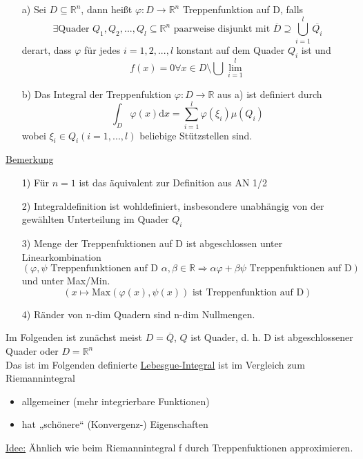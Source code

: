\begin{definition}[Treppenfunktion]\leavevmode
	\begin{itemize}
		\item[a)] Sei $D \subseteq \mathbb{R}^n$, dann heißt $\varphi :D \to \mathbb{R}^n$ Treppenfunktion auf D, falls
		      \[ \exists \text{Quader } Q_1, Q_2, ..., Q_l \subseteq \mathbb{R}^n \text{ paarweise disjunkt mit } \overline{D} \supseteq \bigcup_{i=1}^l \overline{Q_i}\]
		      derart, dass $\varphi$ für jedes $i = 1,2,...,l$ konstant auf dem Quader $Q_i$ ist und \[f(x) = 0 \forall x \in D\setminus \bigcup\lim_{i=1}^l\]
		\item[b)] Das Integral der Treppenfuktion $\varphi\colon D \to \mathbb{R}$ aus a) ist definiert durch
		      \[ \int_D \varphi(x) \text{d}x = \sum_{i=1}^l \varphi(\xi_i) \mu(Q_i)\]
		      wobei $\xi_i \in Q_i (i=1,...,l)$ beliebige Stützstellen sind. 
	\end{itemize}
\end{definition}

\underline{Bemerkung}
\begin{itemize}
	\item[1)] Für $n=1$ ist das äquivalent zur Definition aus AN 1/2
	\item[2)] Integraldefinition ist wohldefiniert, insbesondere unabhängig von der gewählten Unterteilung im Quader $Q_i$
	\item[3)] Menge der Treppenfuktionen auf D ist abgeschlossen unter Linearkombination
	      \[(\varphi, \psi \text{ Treppenfunktionen auf D } \alpha, \beta \in \mathbb{R} \Rightarrow \alpha\varphi + \beta\psi \text{ Treppenfuktionen auf D})\]
	      und unter Max/Min.
	      \[(x \mapsto \text{Max} (\varphi(x), \psi(x)) \text{ ist Treppenfunktion auf D})\]
	\item[4)] Ränder von n-dim Quadern sind n-dim Nullmengen.
\end{itemize}
Im Folgenden ist zunächst meist $D=\overline{Q}$, $Q$ ist Quader, d. h. D ist abgeschlossener Quader oder $D=\mathbb{R}^n$\\
Das ist im Folgenden definierte \underline{Lebesgue-Integral} ist im Vergleich zum Riemannintegral
\begin{itemize}
	\item allgemeiner (mehr integrierbare Funktionen)
	\item hat „schönere“ (Konvergenz-) Eigenschaften
\end{itemize}

\underline{Idee:} Ähnlich wie beim Riemannintegral f durch Treppenfuktionen approximieren.\\

